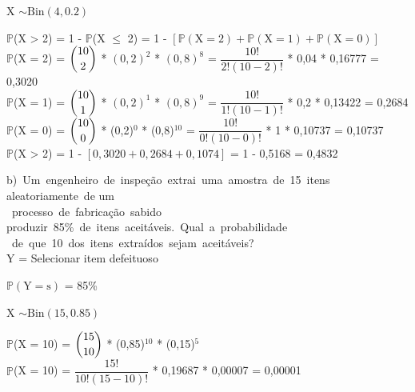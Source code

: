 \documentclass[12pt,a4paper,draft]{article}
\begin{document}
	X $\sim \text{Bin}\left(4, 0.2\right)$
	\vspace{1cm}\\
	\begin{center}
		$\mathbb{P}$(X > 2) = 1 - $\mathbb{P}$(X $\leq$ 2) = 1 - $\left[\mathbb{P}(\text{X} = 2) + \mathbb{P}(\text{X} = 1) + \mathbb{P}(\text{X} = 0)\right]$
		\vspace{0.5cm}\\
		$\mathbb{P}$(X = 2) = $\dbinom{10}{2}$ * $\left(0,2\right)^2$ * $\left(0,8\right)^8$ = $\dfrac{10!}{2!(10-2)!}$ * 0,04 * 0,16777 = 0,3020
		\vspace{0.5cm}\\
		$\mathbb{P}$(X = 1) = $\dbinom{10}{1}$ * $\left(0,2\right)^1$ * $\left(0,8\right)^9$ = $\dfrac{10!}{1!(10-1)!}$ * 0,2 * 0,13422 = 0,2684
		\vspace{0.5cm}\\
		$\mathbb{P}$(X = 0) = $\dbinom{10}{0}$ * (0,2)$^{0}$ * (0,8)$^{10}$ = $\dfrac{10!}{0!(10-0)!}$ * 1 * 0,10737 = 0,10737
		\vspace{0.5cm}\\
		$\mathbb{P}$(X > 2) = 1 - $\left[0,3020 + 0,2684 + 0,1074\right]$ = 1 - 0,5168 = 0,4832
	\end{center}
	\vspace{1cm}
	b) Um engenheiro de inspeção extrai uma amostra de 15 itens aleatoriamente de um\\ processo de fabricação sabido produzir 85\% de itens aceitáveis. Qual a probabilidade\\ de que 10 dos itens extraídos sejam aceitáveis?
	\vspace{0.5cm}\\
	Y = Selecionar item defeituoso
	\begin{center}
		\vspace{1cm}
		$\mathbb{P}\left(\text{Y} = \text{s}\right)$ = 85\%
		\vspace{1cm}\\
	\end{center}
	X $\sim \text{Bin}(15, 0.85)$
	\vspace{1cm}\\
	\begin{center}
		$\mathbb{P}$(X = 10) = $\dbinom{15}{10}$ * (0,85)$^{10}$ * (0,15)$^5$\\
		\vspace{0.25cm}
		$\mathbb{P}$(X = 10) = $\dfrac{15!}{10!(15-10)!}$ * 0,19687 * 0,00007 = 0,00001
	\end{center}
	\vspace{1cm}
\end{document}
